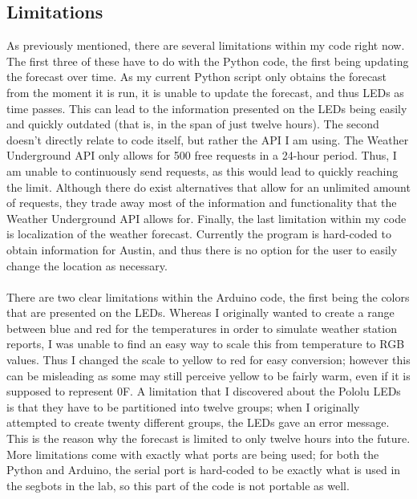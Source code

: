 \documentclass[12pt]{article}
\begin{document}
\subsection{Limitations}
As previously mentioned, there are several limitations within my code right now. The first three of these have to do with the Python code, the first being updating the forecast over time. As my current Python script only obtains the forecast from the moment it is run, it is unable to update the forecast, and thus LEDs as time passes. This can lead to the information presented on the LEDs being easily and quickly outdated (that is, in the span of just twelve hours). The second doesn't directly relate to code itself, but rather the API I am using. The Weather Underground API only allows for 500 free requests in a 24-hour period. Thus, I am unable to continuously send requests, as this would lead to quickly reaching the limit. Although there do exist alternatives that allow for an unlimited amount of requests, they trade away most of the information and functionality that the Weather Underground API allows for. Finally, the last limitation within my code is localization of the weather forecast. Currently the program is hard-coded to obtain information for Austin, and thus there is no option for the user to easily change the location as necessary.\\\\
\indent There are two clear limitations within the Arduino code, the first being the colors that are presented on the LEDs. Whereas I originally wanted to create a range between blue and red for the temperatures in order to simulate weather station reports, I was unable to find an easy way to scale this from temperature to RGB values. Thus I changed the scale to yellow to red for easy conversion; however this can be misleading as some may still perceive yellow to be fairly warm, even if it is supposed to represent 0{\degree}F. A limitation that I discovered about the Pololu LEDs is that they have to be partitioned into twelve groups; when I originally attempted to create twenty different groups, the LEDs gave an error message. This is the reason why the forecast is limited to only twelve hours into the future. More limitations come with exactly what ports are being used; for both the Python and Arduino, the serial port is hard-coded to be exactly what is used in the segbots in the lab, so this part of the code is not portable as well.\\
\end{document}
